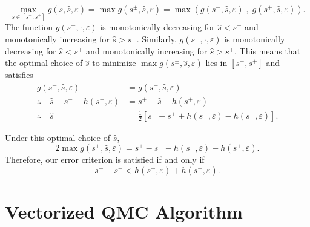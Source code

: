 \documentclass{article}[12pt]
\newcommand{\varepsabs}{\varepsilon_\text{abs}}
\newcommand{\varepsrel}{\varepsilon_\text{rel}}
\begin{document}
\begin{equation*}
    \max_{s \in [s^-,s^+]} g(s,\hat{s},\varepsilon) = \max g(s^\pm,\hat{s},\varepsilon) = \max\left(g(s^-,\hat{s},\varepsilon) \;,\; g(s^+,\hat{s},\varepsilon)\right).
\end{equation*}
The function $g(s^-,\cdot,\varepsilon)$ is monotonically decreasing for $\hat{s} < s^-$ and monotonically increasing for $\hat{s} > s^-$. Similarly, $g(s^+,\cdot,\varepsilon)$ is monotonically decreasing for $\hat{s} < s^+$ and monotonically increasing for $\hat{s} > s^+$. This means that the optimal choice of $\hat{s}$ to minimize $\max g(s^\pm,\hat{s},\varepsilon)$ lies in $[s^-,s^+]$ and satisfies
\begin{align}
    g(s^-,\hat{s},\varepsilon) &= g(s^+,\hat{s},\varepsilon) \nonumber \\
    \therefore \quad \hat{s} - s^- - h(s^-,\varepsilon) &= s^+ - \hat{s} - h(s^+,\varepsilon) \nonumber \\ 
    \therefore \quad \hat{s} &= \frac{1}{2}\left[ s^- + s^+ +h(s^-,\varepsilon) - h(s^+,\varepsilon) \right]. \label{eq:shat_opt}
\end{align}

Under this optimal choice of $\hat{s}$, 
\begin{equation*}
    \label{eq:g_under_shat_opt}
    2 \max g(s^\pm,\hat{s},\varepsilon) =  s^+  -  s^-  - h(s^-,\varepsilon) - h(s^+,\varepsilon).
\end{equation*}
Therefore, our error criterion is satisfied if and only if
\begin{equation}
    s^+-s^-<h(s^-,\varepsilon)+h(s^+,\varepsilon).
    \label{eq:sc}
\end{equation}

\section{Vectorized QMC Algorithm} \label{sec: Vectorized Implementation}
\end{document}
